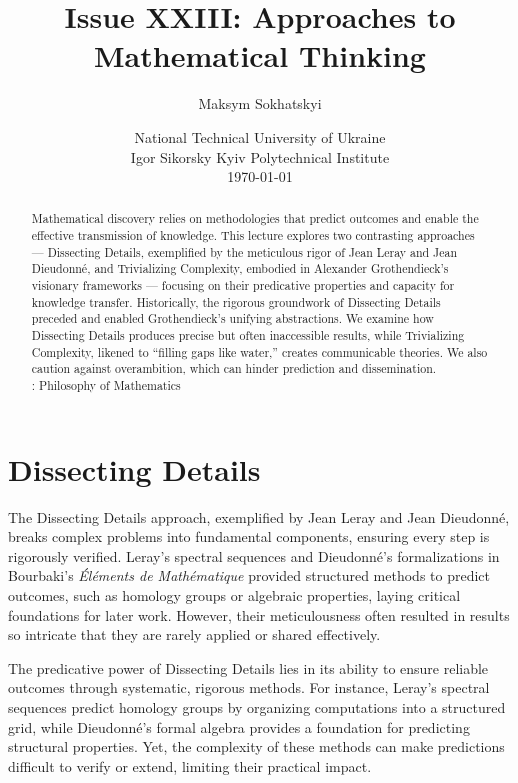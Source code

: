 \documentclass{article}
\begin{document}
\title{Issue XXIII: Approaches to Mathematical Thinking}
\author{Maksym Sokhatskyi}
\date{ National Technical University of Ukraine \\
       \small Igor Sikorsky Kyiv Polytechnical Institute \\
       \today }
\maketitle

\begin{abstract}
Mathematical discovery relies on methodologies that predict outcomes and enable
the effective transmission of knowledge. This lecture explores two contrasting
approaches --- Dissecting Details, exemplified by the meticulous rigor of Jean Leray
and Jean Dieudonné, and Trivializing Complexity, embodied in Alexander Grothendieck’s
visionary frameworks --- focusing on their predicative properties and capacity for
knowledge transfer. Historically, the rigorous groundwork of Dissecting Details
preceded and enabled Grothendieck’s unifying abstractions. We examine how
Dissecting Details produces precise but often inaccessible results, while
Trivializing Complexity, likened to “filling gaps like water,” creates communicable
theories. We also caution against overambition, which can hinder prediction and dissemination. \\
: Philosophy of Mathematics
\end{abstract}

\tableofcontents

\section{Dissecting Details}
The Dissecting Details approach, exemplified by Jean Leray and Jean Dieudonné, breaks complex problems into fundamental components, ensuring every step is rigorously verified. Leray’s spectral sequences and Dieudonné’s formalizations in Bourbaki’s \textit{Éléments de Mathématique} provided structured methods to predict outcomes, such as homology groups or algebraic properties, laying critical foundations for later work. However, their meticulousness often resulted in results so intricate that they are rarely applied or shared effectively.

The predicative power of Dissecting Details lies in its ability to ensure reliable outcomes through systematic, rigorous methods. For instance, Leray’s spectral sequences predict homology groups by organizing computations into a structured grid, while Dieudonné’s formal algebra provides a foundation for predicting structural properties. Yet, the complexity of these methods can make predictions difficult to verify or extend, limiting their practical impact.
\end{document}

